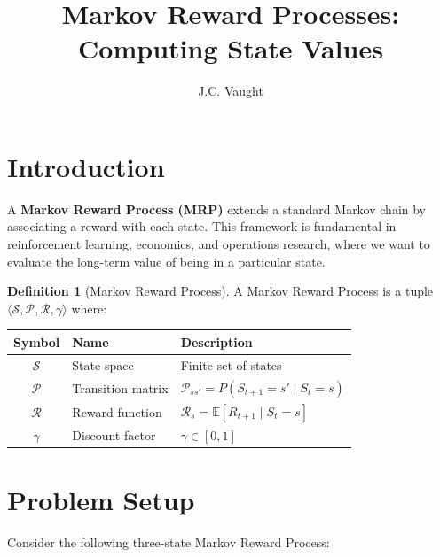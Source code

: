 \documentclass[11pt]{article}
\title{\textcolor{garnet}{\textbf{Markov Reward Processes: Computing State Values}}}
\author{J.C. Vaught}
\date{\vspace{-2em}}
\theoremstyle{definition}
\newtheorem{definition}{Definition}
\begin{document}
\maketitle

\section{Introduction}

A \textbf{Markov Reward Process (MRP)} extends a standard Markov chain by associating a reward with each state. This framework is fundamental in reinforcement learning, economics, and operations research, where we want to evaluate the long-term value of being in a particular state.

\begin{definition}[Markov Reward Process]
A Markov Reward Process is a tuple $\langle \mathcal{S}, \mathcal{P}, \mathcal{R}, \gamma \rangle$ where:

\begin{center}
\begin{tabular}{c l l}
\hline
\textbf{Symbol} & \textbf{Name} & \textbf{Description} \\
\hline
$\mathcal{S}$ & State space & Finite set of states \\
$\mathcal{P}$ & Transition matrix & $\mathcal{P}_{ss'} = P(S_{t+1} = s' \mid S_t = s)$ \\
$\mathcal{R}$ & Reward function & $\mathcal{R}_s = \mathbb{E}[R_{t+1} \mid S_t = s]$ \\
$\gamma$ & Discount factor & $\gamma \in [0, 1]$ \\
\hline
\end{tabular}
\end{center}
\end{definition}

\section{Problem Setup}

Consider the following three-state Markov Reward Process:
\end{document}
